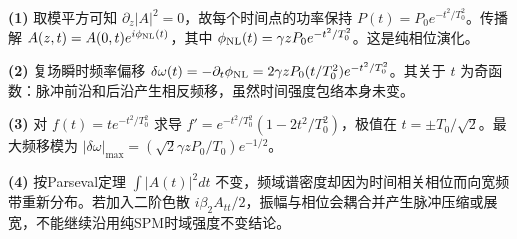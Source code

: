 \par\noindent\textbf{(1)} 取模平方可知 \(\partial_z|A|^2=0\)，故每个时间点的功率保持 \(P(t)=P_0e^{-t^2/T_0^2}\)。传播解 \(A(z,t)=A(0,t)e^{i\phi_{\rm NL}(t)}\)，其中 \(\phi_{\rm NL}(t)=\gamma zP_0e^{-t^2/T_0^2}\)。这是纯相位演化。
\par\noindent\textbf{(2)} 复场瞬时频率偏移 \(\delta\omega(t)=-\partial_t\phi_{\rm NL}=2\gamma zP_0(t/T_0^2)e^{-t^2/T_0^2}\)。其关于 \(t\) 为奇函数：脉冲前沿和后沿产生相反频移，虽然时间强度包络本身未变。
\par\noindent\textbf{(3)} 对 \(f(t)=t e^{-t^2/T_0^2}\) 求导 \(f'=e^{-t^2/T_0^2}(1-2t^2/T_0^2)\)，极值在 \(t=\pm T_0/\sqrt2\)。最大频移模为 \(|\delta\omega|_{\max}=(\sqrt2\gamma zP_0/T_0)e^{-1/2}\)。
\par\noindent\textbf{(4)} 按Parseval定理 \(\int|A(t)|^2dt\) 不变，频域谱密度却因为时间相关相位而向宽频带重新分布。若加入二阶色散 \(i\beta_2A_{tt}/2\)，振幅与相位会耦合并产生脉冲压缩或展宽，不能继续沿用纯SPM时域强度不变结论。
